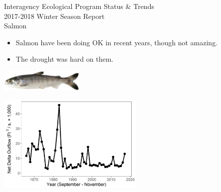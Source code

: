 \documentclass[]{article}\usepackage[]{graphicx}\usepackage[]{color}
\begin{document}
\newpage


\begin{Row}
  \begin{Cell}{7}
    \vspace{0.2cm}
    \begin{center}
      \doublespacing
      {\Large Interagency Ecological Program Status \& Trends } \\
      \vspace{0.2cm}
      {\Large 2017-2018 Winter Season Report} \\
      \vspace{0.3cm}
      {\Huge Salmon} \\
      \vspace{0.3cm}
      \singlespacing
      
			\begin{minipage}{240pt}
        \begin{center}
          \begin{itemize}[leftmargin=*]
              \item Salmon have been doing OK in recent years, though not amazing.
              \item The drought was hard on them.
          \end{itemize}
        \end{center}
			\end{minipage}
      
      \vspace{1cm}
      \includegraphics[width=4cm,trim=0 0 0 0,clip,align=m]{figures/salmon/photo_salmon.png}
    \end{center}
  \end{Cell}
  \begin{Cell}{6}
    \vspace{0.2cm}
    \begin{center}
      \includegraphics[width=7cm,trim=0 0 0 0,clip,align=m]{figures/salmon/outflow_tmp.png}
    \end{center}
  \end{Cell}
\end{Row}
\end{document}
